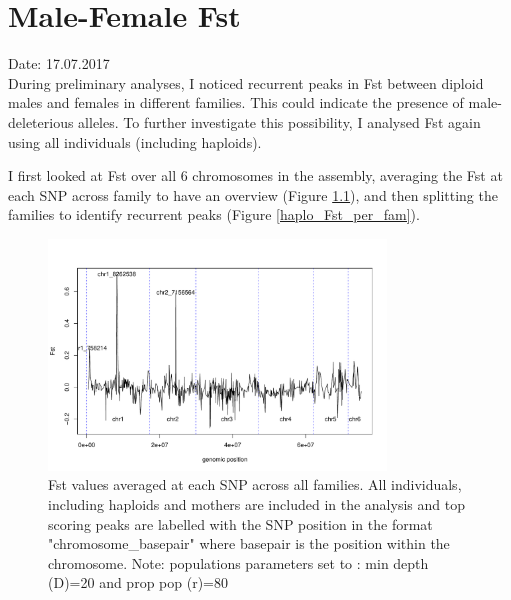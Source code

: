 \documentclass[10pt,a4paper]{report}
\begin{document}
\chapter{Male-Female Fst}

Date: 17.07.2017\\
During preliminary analyses, I noticed recurrent peaks in Fst between diploid males and females in different families. This could indicate the presence of male-deleterious alleles. To further investigate this possibility, I analysed Fst again using all individuals (including haploids).

I first looked at Fst over all 6 chromosomes in the assembly, averaging the Fst at each SNP across family to have an overview (Figure \ref{haplo_Fst_avg}), and then splitting the families to identify recurrent peaks (Figure \ref{haplo_Fst_per_fam}).

\begin{figure}[h]
	\begin{center}
		\includegraphics[width=0.8\textwidth]{M-F_Fst/haplo_avg_all_Fst.pdf}
		\caption{Fst values averaged at each SNP across all families. All individuals, including haploids and mothers are included in the analysis and top scoring peaks are labelled with the SNP position in the format "chromosome\_basepair" where basepair is the position within the chromosome. Note: populations parameters set to : min depth (D)=20 and prop pop (r)=80}
		\label{haplo_Fst_avg}
	\end{center}
\end{figure}
\end{document}
